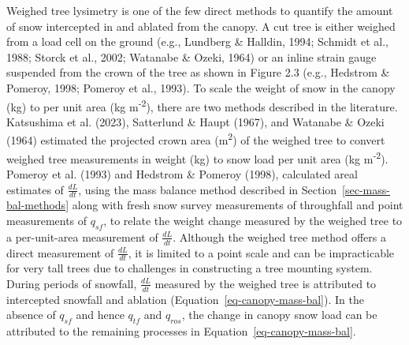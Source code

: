 \documentclass[
  letterpaper,
]{tex/uofsthesis-cs}
\begin{document}
Weighed tree lysimetry is one of the few direct methods to quantify the
amount of snow intercepted in and ablated from the canopy. A cut tree is
either weighed from a load cell on the ground (e.g., Lundberg \&
Halldin, 1994; Schmidt et al., 1988; Storck et al., 2002; Watanabe \&
Ozeki, 1964) or an inline strain gauge suspended from the crown of the
tree as shown in Figure 2.3 (e.g., Hedstrom \& Pomeroy, 1998; Pomeroy et
al., 1993). To scale the weight of snow in the canopy (kg) to per unit
area (kg m\textsuperscript{-2}), there are two methods described in the
literature. Katsushima et al. (2023), Satterlund \& Haupt (1967), and
Watanabe \& Ozeki (1964) estimated the projected crown area
(m\textsuperscript{2}) of the weighed tree to convert weighed tree
measurements in weight (kg) to snow load per unit area (kg
m\textsuperscript{-2}). Pomeroy et al. (1993) and Hedstrom \& Pomeroy
(1998), calculated areal estimates of \(\frac{dL}{dt}\), using the mass
balance method described in Section~\ref{sec-mass-bal-methods} along
with fresh snow survey measurements of throughfall and point
measurements of \(q_{sf}\), to relate the weight change measured by the
weighed tree to a per-unit-area measurement of \(\frac{dL}{dt}\).
Although the weighed tree method offers a direct measurement of
\(\frac{dL}{dt}\), it is limited to a point scale and can be
impracticable for very tall trees due to challenges in constructing a
tree mounting system. During periods of snowfall, \(\frac{dL}{dt}\)
measured by the weighed tree is attributed to intercepted snowfall and
ablation (Equation~\ref{eq-canopy-mass-bal}). In the absence of
\(q_{sf}\) and hence \(q_{tf}\) and \(q_{ros}\), the change in canopy
snow load can be attributed to the remaining processes in
Equation~\ref{eq-canopy-mass-bal}.
\end{document}
